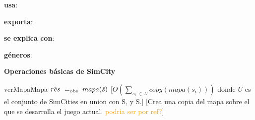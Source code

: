 \begin{Interfaz}
    \textbf{usa}: \completar
    
    \textbf{exporta}: \completar 

    \textbf{se explica con}: 
  
    \textbf{géneros}: 
    
    \vspace*{2ex}%
    \noindent\textbf{\Large Operaciones básicas de SimCity}
    
    \InterfazFuncion
    {verMapa}{}{Mapa}
    {$\hat{res}\ =_{\mathrm{obs}}\ mapa(\hat{s})$}
    [$\Theta(\displaystyle\sum_{s_i\ \in\ U}{copy(mapa(s_i))})$ donde $U$ es el conjunto de SimCities en union con S, y S.]
    [Crea una copia del mapa sobre el que se desarrolla el juego actual. \textcolor{orange}{podria ser por ref?}]


\end{Interfaz}